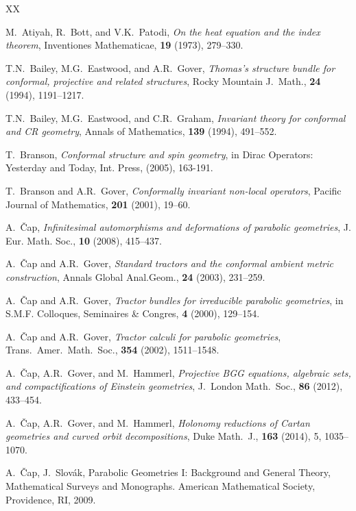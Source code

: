 \documentclass[a4paper,12pt]{amsart}
\theoremstyle{remark}
\begin{document}
\begin{thebibliography}{XX}



 M.\ Atiyah, R.\ Bott, and V.K.\ Patodi, {\em On the heat 
		equation and the index theorem}, Inventiones Mathematicae, 
		{\bf 19} (1973), 279--330.

 T.N.\ Bailey, M.G.\ Eastwood, and A.R.\ Gover, {\em
		Thomas's structure bundle for conformal, projective and related
		structures}, Rocky Mountain J.\ Math., {\bf 24} (1994),
		1191--1217.

 T.N.\ Bailey, M.G.\ Eastwood, and C.R.\ Graham, {\em Invariant
		theory for conformal and CR geometry}, Annals of Mathematics,
		{\bf 139} (1994), 491--552.
		
 T.\ Branson, {\em Conformal structure and
  spin geometry}, in Dirac Operators: Yesterday and Today, Int. Press,
  (2005), 163-191.

 T.\ Branson and A.R.\ Gover, {\em Conformally
  invariant non-local operators}, Pacific Journal of Mathematics, {\bf
  201} (2001), 19--60.
		
 A.\ \v Cap, {\em Infinitesimal automorphisms and
  deformations of parabolic geometries}, J. Eur. Math. Soc., {\bf 10}
  (2008), 415--437.

 A.\ \v Cap and A.R.\ Gover, {\em Standard tractors
  and the conformal ambient metric construction}, Annals Global
  Anal.Geom.,  {\bf 24} (2003), 231--259.

 A.\ \v Cap and A.R.\ Gover, {\em Tractor bundles
  for irreducible parabolic geometries}, in S.M.F. Colloques,
  Seminaires \& Congres, {\bf 4} (2000), 129--154.

 A.\ \v Cap and A.R.\ Gover, {\em Tractor calculi
		for parabolic geometries}, Trans.\ Amer.\ Math.\ Soc., {\bf 354}
		(2002), 1511--1548.

 A.\ \v Cap, A.R.\ Gover, and M.\ Hammerl, {\em
  Projective BGG equations, algebraic sets, and compactifications of
  Einstein geometries}, J.\ London Math.\ Soc., {\bf 86} (2012), 
  433--454.


 A.\ \v Cap, A.R.\ Gover, and M.\ Hammerl, {\em Holonomy
  reductions of Cartan geometries and curved orbit decompositions},
  Duke Math.\ J., {\bf 163} (2014), 5, 1035--1070.


 A.\ \v Cap, J.\ Slov\'{a}k, {Parabolic Geometries I:
		Background and General Theory}, Mathematical Surveys and
		Monographs. American Mathematical Society, Providence, RI, 2009.


\end{thebibliography}
\end{document}
